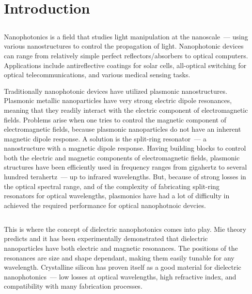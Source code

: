 \section{Introduction}
\label{ch:Intro}
    \subsection{}
        \label{sec:Nanophotonics}
            Nanophotonics is a field that studies light manipulation at the nanoscale~--- using various nanostructures to control the
        propagation of light. Nanophotonic devices can range from relatively simple perfect reflectors/absorbers to optical computers.
        Applications include antireflective coatings for solar cells, all-optical switching for optical telecommunications, and various
        medical sensing tasks.

            Traditionally nanophotonic devices have utilized plasmonic nanostructures. Plasmonic metallic nanoparticles have very strong
        electric dipole resonances, meaning that they readily interact with the electric component of electromagnetic fields. Problems arise
        when one tries to control the magnetic component of electromagnetic fields, because plasmonic nanoparticles do not have an inherent
        magnetic dipole response. A solution is the split-ring resonator~--- a nanostructure with a magnetic dipole response. Having building
        blocks to control both the electric and magnetic components of electromagnetic fields, plasmonic structures have been efficiently
        used in frequency ranges from gigahertz to several hundred terahertz~--- up to infrared wavelengths. But, because of strong losses
        in the optical spectral range, and of the complexity of fabricating split-ring resonators for optical wavelengths, plasmonics have
        had a lot of difficulty in achieved the required performance for optical nanophotnoic devcies.

        \cite{krasnok2015towards}
    \subsection{}
            This is where the concept of dielectric nanophotonics comes into play. Mie theory predicts\cite{mie1908beitrage} and
        it has been experimentally demonstrated\cite{kuznetsov2012magnetic} that dielectric nanoparticles have both electric and
        magnetic resonances. The positions of the resonances are size and shape dependant, making them easily tunable for any wavelength.
        Crystalline silicon has proven itself as a good material for dielectric nanophotonics~--- low losses at optical wavelengths\cite{palik1998handbook},
        high refractive index, and compatibility with many fabrication processes\cite{popa2008compact,zhao2009mie,evlyukhin2010optical,garcia2011strong,
        krasnok2012all,ginn2012realizing,fu2012directional,krasnok2015towards}.

